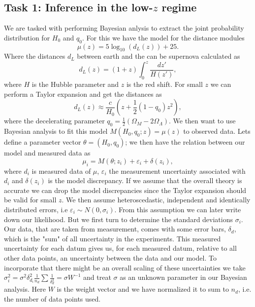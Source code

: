 \documentclass[11pt,a4paper]{article}
\begin{document}
\subsection[Task 1]{Task 1: Inference in the low-$z$ regime}
We are tasked with performing Bayesian anlysis to extract the joint probability distribution for $H_0$ and $q_0$. For this we have the model for the distance modules
\begin{equation*}
    \mu(z) = 5\log_{10}(d_L(z)) + 25.
\end{equation*}
Where the distances $d_L$ between earth and the can be supernova calculated as
\begin{equation}
    \label{eq:dl}
    d_L(z) = (1 + z )\int_0^z \frac{dz'}{H(z')},
\end{equation}
where $H$ is the Hubble parameter and $z$ is the red shift. For small $z$ we can perform a Taylor expansion and get the distances as 
\begin{equation*}
    d_L(z) \approx \frac{c}{H_0} \left(z + \frac{1}{2}(1 - q_0)z^2 \right),
\end{equation*}
where the decelerating parameter $q_0 = \frac{1}{2}(\Omega_M - 2 \Omega_\Lambda)$. We then want to use Bayesian analysis to fit this model $M(H_0,q_0; z) = \mu(z)$ to observed data. Lets define a parameter vector $\theta = (H_0, q_0)$; we then have the relation between our model and measured data as
\begin{equation*}
    \mu_i = M(\theta; z_i) + \varepsilon_i + \delta(z_i),
\end{equation*}
where $d_i$ is measured data of $\mu$, $\varepsilon_i$ the measurement uncertainty associated with $d_i$ and $\delta(z_i)$ is the model discrepancy. If we assume that the overall theory is accurate we can drop the model discrepancies since the Taylor expansion should be valid for small $z$. We then assume heteroscedastic, independent and identically distributed errors, i.e $\varepsilon_i \sim N(0, \sigma_i)$. From this assumption we can later write down our likelihood. But we first turn to determine the standard deviations $\sigma_i$. Our data, that are taken from measurement, comes with some error bars, $\delta_d$, which is the "sum" of all uncertainty in the experiments. This measured uncertainty for each datum gives us, for each measured datum, relative to all other data points, an uncertainty between the data and our model. To incorporate that there might be an overall scaling of these uncertainties we take $\sigma_i^2 = \sigma^2 \delta_{d_i}^2 \frac{1}{n_d}\sum \frac{1}{\delta_d^2} = \sigma W^{-1}$ and treat $\sigma$ as an unknown parameter in our Bayesian analysis. Here $W$ is the weight vector and we have normalized it to sum to $n_d$, i.e. the number of data points used.
\end{document}

